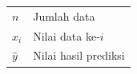 \noindent
\begin{longtable}{@{}p{30mm}p{}@{}}
$n$ & Jumlah data \\
$x_i$ & Nilai data ke-$i$ \\
$\hat{y}$ & Nilai hasil prediksi \\
\end{longtable}
